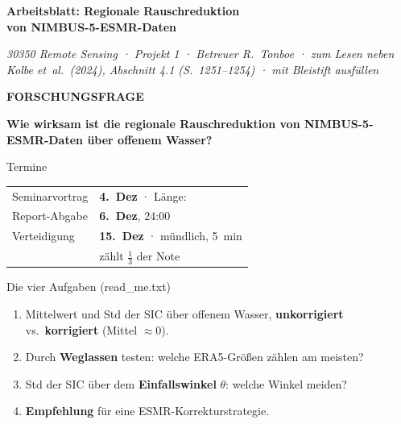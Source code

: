 \documentclass[10pt,a4paper]{article}
\newcommand{\blank}[1][22mm]{\makebox[#1]{\hrulefill}}
\newcommand{\lbl}[1]{{\scriptsize\bfseries\MakeUppercase{#1}}\par\vspace{0.3mm}}
\begin{document}
{\LARGE\bfseries Arbeitsblatt: Regionale Rauschreduktion\\[0.5mm] von NIMBUS-5-ESMR-Daten}\par
\vspace{1mm}
{\footnotesize\itshape 30350 Remote Sensing · Projekt 1 · Betreuer R.~Tonboe · zum Lesen neben Kolbe et~al.\ (2024), Abschnitt 4.1 (S.~1251--1254) · mit Bleistift ausfüllen}

\begin{dick}
\lbl{Forschungsfrage}
{\large\bfseries Wie wirksam ist die regionale Rauschreduktion von NIMBUS-5-ESMR-Daten über offenem Wasser?}
\end{dick}

\begin{minipage}[t]{0.42\linewidth}
\vspace{0pt}
\begin{feld}[before skip=0pt]{Termine}
\begin{tabularx}{\linewidth}{@{}l>{\raggedright\arraybackslash}X@{}}
Seminarvortrag & \textbf{4.~Dez} · Länge: \blank[12mm]\\
Report-Abgabe & \textbf{6.~Dez}, 24:00\\
Verteidigung & \textbf{15.~Dez} · mündlich, 5~min\\
& {\footnotesize zählt \(\tfrac{1}{3}\) der Note}
\end{tabularx}
\end{feld}
\end{minipage}\hfill
\begin{minipage}[t]{0.555\linewidth}
\vspace{0pt}
\begin{feld}[before skip=0pt]{Die vier Aufgaben (read\_me.txt)}
\footnotesize
\begin{enumerate}
\item Mittelwert und Std der SIC über offenem Wasser, \textbf{unkorrigiert} vs.\ \textbf{korrigiert} (Mittel \(\approx 0\)).
\item Durch \textbf{Weglassen} testen: welche ERA5-Größen zählen am meisten?
\item Std der SIC über dem \textbf{Einfallswinkel} \(\theta\): welche Winkel meiden?
\item \textbf{Empfehlung} für eine ESMR-Korrekturstrategie.
\end{enumerate}
\end{feld}
\end{minipage}
\end{document}

